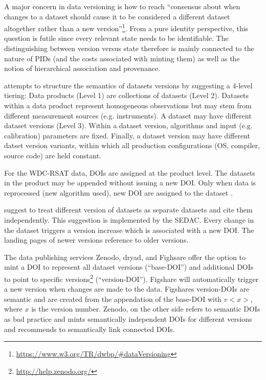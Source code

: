 \documentclass[a4paper,10pt]{article}
\begin{document}
A major concern in data versioning is how to reach ``consensus about when changes to a dataset should cause it to be considered a different dataset altogether rather than a new version''\footnote{\url{https://www.w3.org/TR/dwbp/\#dataVersioning}}.
From a pure identity perspective, this question is futile since every relevant state needs to be identifiable. The distinguishing between version versus state therefore is mainly connected to the nature of \glspl{PID} (and the costs associated with minting them) \citep{Klump2016} as well as the notion of hierarchical association and provenance. 

\cite{Barkstrom2003} attempts to structure the semantics of datasets versions by suggesting a 4-level tiering: Data products (Level 1) are collections of datasets (Level 2). Datasets within a data product represent homogeneous observations but may stem from different measurement sources (e.g. instruments). A dataset may have different dataset versions (Level 3). Within a dataset version, algorithms and input (e.g. calibration) parameters are fixed. Finally, a dataset version may have different datset version variants, within which all production configurations (OS, compiler, source code) are held constant.

For the WDC-RSAT data, \glspl{DOI} are assigned at the product level. The datasets in the product may be appended without issuing a new DOI. Only when data is reprocessed (new algorithm used), new DOI are assigned to the dataset \citep{Huber2015}.

\citep{AltKin07} suggest to treat different version of datasets as separate datasets and cite them independently. This suggestion is implemented by the \gls{SEDAC}\cite{Downs2013}. Every change in the dataset triggers a version increase which is associated with a new \gls{DOI}. The landing pages of newer versions reference to older versions. 

The data publishing services Zenodo, dryad, and Fighsare offer the option to mint a \gls{DOI} to represent all dataset versions (``base-DOI'') and additional \glspl{DOI} to point to specific versions\footnote{\url{http://help.zenodo.org/}} (``version-DOI''). Figshare will automatically trigger a new version when changes are made to the data. Figshares version-\glspl{DOI} are semantic and are created from the appendation of the base-DOI with $v<x>$, where $x$ is the version number. Zenodo, on the other side refers to semantic \glspl{DOI} as bad practice and mints semantically independent \glspl{DOI} for different versions and recommends to semantically link connected \glspl{DOI}.
\end{document}
